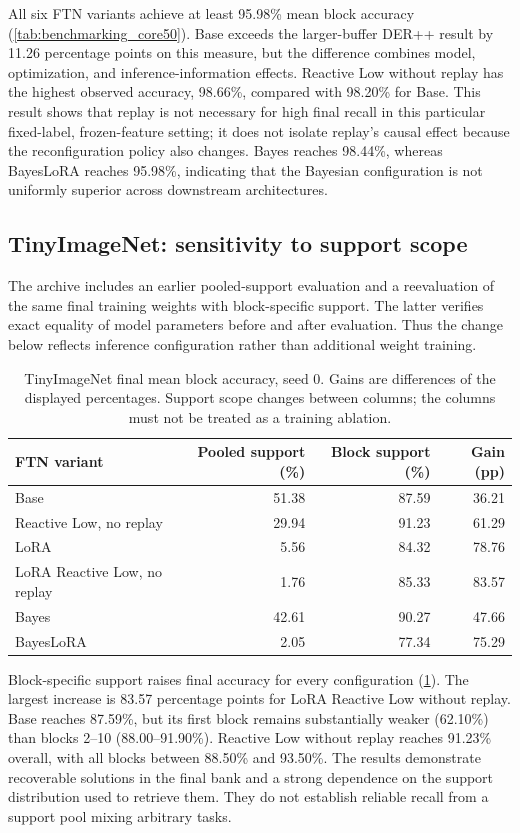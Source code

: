 All six FTN variants achieve at least 95.98\% mean block accuracy (\cref{tab:benchmarking_core50}). Base exceeds the larger-buffer DER++ result by 11.26 percentage points on this measure, but the difference combines model, optimization, and inference-information effects. Reactive Low without replay has the highest observed accuracy, 98.66\%, compared with 98.20\% for Base. This result shows that replay is not necessary for high final recall in this particular fixed-label, frozen-feature setting; it does not isolate replay's causal effect because the reconfiguration policy also changes. Bayes reaches 98.44\%, whereas BayesLoRA reaches 95.98\%, indicating that the Bayesian configuration is not uniformly superior across downstream architectures.

\subsection{TinyImageNet: sensitivity to support scope}
The archive includes an earlier pooled-support evaluation and a reevaluation of the same final training weights with block-specific support. The latter verifies exact equality of model parameters before and after evaluation. Thus the change below reflects inference configuration rather than additional weight training.
\begin{table}[htbp]
\centering\small
\begin{tabular}{lrrr}\toprule
FTN variant & Pooled support (\%) & Block support (\%) & Gain (pp)\\\midrule
Base&51.38&87.59&36.21\\
Reactive Low, no replay&29.94&91.23&61.29\\
LoRA&5.56&84.32&78.76\\
LoRA Reactive Low, no replay&1.76&85.33&83.57\\
Bayes&42.61&90.27&47.66\\
BayesLoRA&2.05&77.34&75.29\\\bottomrule
\end{tabular}
\caption{TinyImageNet final mean block accuracy, seed 0. Gains are differences of the displayed percentages. Support scope changes between columns; the columns must not be treated as a training ablation.}\label{tab:benchmarking_tiny}
\end{table}

Block-specific support raises final accuracy for every configuration (\cref{tab:benchmarking_tiny}). The largest increase is 83.57 percentage points for LoRA Reactive Low without replay. Base reaches 87.59\%, but its first block remains substantially weaker (62.10\%) than blocks 2--10 (88.00--91.90\%). Reactive Low without replay reaches 91.23\% overall, with all blocks between 88.50\% and 93.50\%. The results demonstrate recoverable solutions in the final bank and a strong dependence on the support distribution used to retrieve them. They do not establish reliable recall from a support pool mixing arbitrary tasks.

